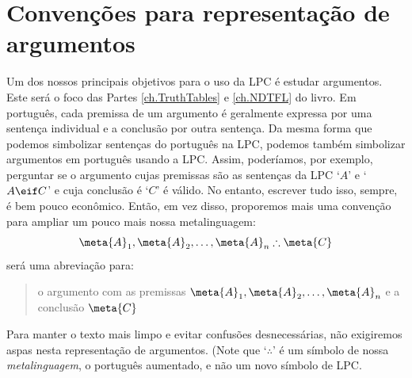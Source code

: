\section{Convenções para representação de argumentos}
Um dos nossos principais objetivos para o uso da LPC é estudar argumentos. Este será o foco das Partes \ref{ch.TruthTables} e \ref{ch.NDTFL} do livro.
Em português, cada premissa de um argumento é geralmente expressa por uma sentença individual e a conclusão por outra sentença.
Da mesma forma que podemos simbolizar sentenças do português na LPC, podemos também simbolizar argumentos em português usando a LPC.
Assim, poderíamos, por exemplo, perguntar se o argumento cujas premissas são as sentenças da LPC `$A$' e `$A \eif C$' e cuja conclusão é `$C$' é válido.
No entanto, escrever tudo isso, sempre, é bem pouco econômico.
Então, em vez disso, proporemos mais uma convenção para ampliar um pouco mais nossa metalinguagem:
	$$\meta{A}_1, \meta{A}_2, \ldots, \meta{A}_n \therefore \meta{C}$$
será uma abreviação para:
	\begin{quote}
		o argumento com as premissas $\meta{A}_1, \meta{A}_2, \ldots, \meta{A}_n$ e a conclusão $\meta{C}$
	\end{quote}
Para manter o texto mais limpo e evitar confusões desnecessárias, não exigiremos aspas nesta representação de argumentos.
(Note que `$\therefore$' é um símbolo de nossa \emph{metalinguagem}, o português aumentado, e não um novo símbolo de LPC.

